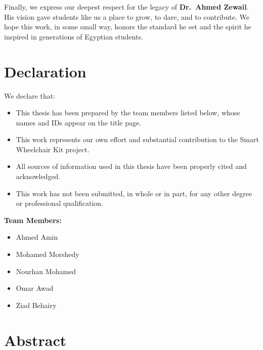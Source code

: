 \documentclass[12pt,a4paper]{report}
\begin{document}
\par\vspace{0.5cm}

Finally, we express our deepest respect for the legacy of \textbf{Dr.\ Ahmed Zewail}.
His vision gave students like us a place to grow, to dare, and to contribute. We hope
this work, in some small way, honors the standard he set and the spirit he inspired
in generations of Egyptian students.


\chapter*{Declaration}

We declare that:

\begin{itemize}
    \item This thesis has been prepared by the team members listed below, whose names and IDs appear on the title page.
    \item This work represents our own effort and substantial contribution to the Smart Wheelchair Kit project.
    \item All sources of information used in this thesis have been properly cited and acknowledged.
    \item This work has not been submitted, in whole or in part, for any other degree or professional qualification.
\end{itemize}

\vspace{1.5cm}

\noindent
\textbf{Team Members:}

\begin{itemize}
    \item Ahmed Amin
    \item Mohamed Morshedy
    \item Nourhan Mohamed
    \item Omar Awad
    \item Ziad Behairy
\end{itemize}

\chapter*{Abstract}
\end{document}
